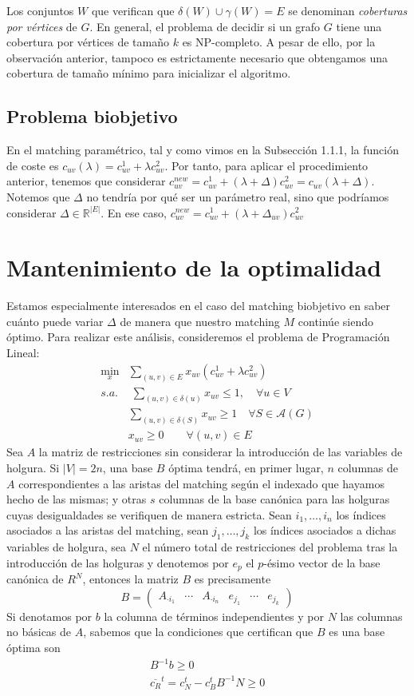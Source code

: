 \documentclass[twoside,a4paper,openright,12pt,tikz]{book}
\newcommand{\R}{\mathbb{R}}
\begin{document}
Los conjuntos $W$ que verifican que $\delta(W)\cup\gamma(W)=E$ se denominan \textit{coberturas por vértices} de $G$. En general, el problema de decidir si un grafo $G$ tiene una cobertura por vértices de tamaño $k$ es NP-completo. A pesar de ello, por la observación anterior, tampoco es estrictamente necesario que obtengamos una cobertura de tamaño mínimo para inicializar el algoritmo. 

\subsection{Problema biobjetivo}
En el matching paramétrico, tal y como vimos en la Subsección 1.1.1, la función de coste es $c_{uv}(\lambda) = c^1_{uv} + \lambda c^2_{uv}$. Por tanto, para aplicar el procedimiento anterior, tenemos que considerar $c_{uv}^{new} = c^1_{uv} + (\lambda + \Delta) c^2_{uv}= c_{uv}(\lambda+\Delta)$. Notemos que $\Delta$ no tendría por qué ser un parámetro real, sino que podríamos considerar $\Delta \in \R^{|E|}$. En ese caso, $c_{uv}^{new} = c^1_{uv} + (\lambda + \Delta_{uv}) c^2_{uv}$ 
\section{Mantenimiento de la optimalidad}
Estamos especialmente interesados en el caso del matching biobjetivo en saber cuánto puede variar $\Delta$ de manera que nuestro matching $M$ continúe siendo óptimo. Para realizar este análisis, consideremos el problema de Programación Lineal:
\begin{align*}
\min_x & \sum_{(u,v) \in E}x_{uv}(c^1_{uv} + \lambda c^2_{uv})\\
s.a.&\;\sum_{(u,v)\in\delta(u)} x_{uv} \leq 1, \quad \forall u \in V\\
&\sum_{(u,v)\in \delta(S)} x_{uv} \geq 1\quad \forall S \in \mathcal{A}(G)	\\
&x_{uv} \geq 0 \qquad \forall(u,v)\in E
\end{align*}
Sea $A$ la matriz de restricciones sin considerar la introducción de las variables de holgura. Si $|V|=2n$, una base $B$ óptima tendrá, en primer lugar, $n$ columnas de $A$ correspondientes a las aristas del matching según el indexado que hayamos hecho de las mismas; y otras $s$ columnas de la base canónica para las holguras cuyas desigualdades se verifiquen de manera estricta. Sean $i_1,\dotsc,i_n$ los índices asociados a las aristas del matching, sean $j_1,\dotsc,j_k$ los índices asociados a dichas variables de holgura, sea $N$ el número total de restricciones del problema tras la introducción de las holguras y denotemos por $e_p$ el $p$-ésimo vector de la base canónica de $R^N$, entonces la matriz $B$ es precisamente
$$ B= 
\begin{pmatrix}
A_{\cdot i_1} & \cdots & A_{\cdot i_n} & e_{j_1} & \cdots & e_{j_k}
\end{pmatrix}
$$
Si denotamos por $b$ la columna de términos independientes y por $N$ las columnas no básicas de $A$, sabemos que la condiciones que certifican que $B$ es una base óptima son
\begin{align*}
B^{-1}b\geq0\\
\overline{c_R}^t = c_N^t - c_B^t B^{-1}N\geq 0
\end{align*}
\end{document}

